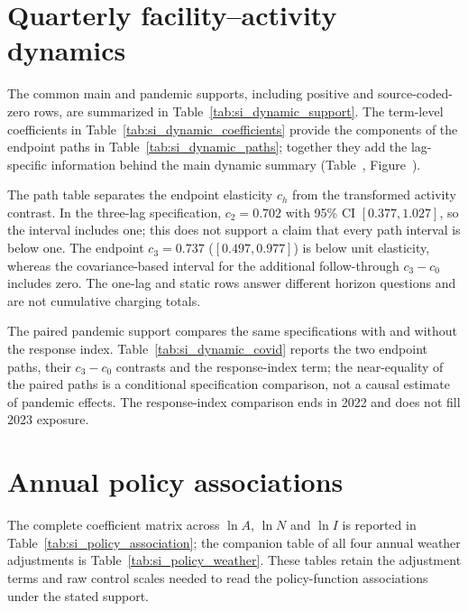 \section{Quarterly facility--activity dynamics}
\label{sec:si-quarterly}


The common main and pandemic supports, including positive and source-coded-zero
rows, are summarized in Table~\ref{tab:si_dynamic_support}.  The term-level
coefficients in Table~\ref{tab:si_dynamic_coefficients} provide the components
of the endpoint paths in Table~\ref{tab:si_dynamic_paths}; together they add
the lag-specific information behind the main dynamic summary (Table~,
Figure~).




The path table separates the endpoint elasticity $c_h$ from the transformed
activity contrast.  In the three-lag specification, $c_2=0.702$ with 95\% CI
$[0.377,1.027]$, so the interval includes one; this does not support a claim
that every path interval is below one.  The endpoint $c_3=0.737$
($[0.497,0.977]$) is below unit elasticity, whereas the covariance-based
interval for the additional follow-through $c_3-c_0$ includes zero.  The one-lag and static rows answer different
horizon questions and are not cumulative charging totals.

The paired pandemic support compares the same specifications with and without
the response index.  Table~\ref{tab:si_dynamic_covid} reports the two endpoint
paths, their $c_3-c_0$ contrasts and the response-index term; the near-equality
of the paired paths is a conditional specification comparison, not a causal
estimate of pandemic effects.  The response-index comparison ends in 2022 and
does not fill 2023 exposure.

\FloatBarrier

\section{Annual policy associations}
\label{sec:si-associations}

The complete coefficient matrix across $\ln A$, $\ln N$ and $\ln I$ is
reported in Table~\ref{tab:si_policy_association}; the companion table of all
four annual weather adjustments is Table~\ref{tab:si_policy_weather}.  These
tables retain the adjustment terms and raw control scales needed to read the
policy-function associations under the stated support.


\FloatBarrier

